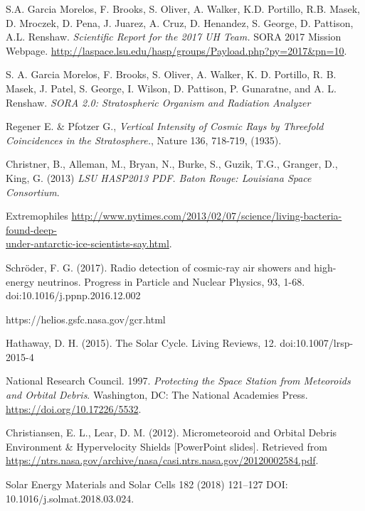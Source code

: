 \newpage

\begin{thebibliography}{9}
S.A. Garcia Morelos, F. Brooks, S. Oliver, A. Walker, K.D. Portillo, R.B. Masek, D. Mroczek, D. Pena, J. Juarez, A. Cruz, D. Henandez, S. George, D. Pattison, A.L. Renshaw. \textit{Scientific Report for the 2017 UH Team.} SORA 2017 Mission Webpage. \url{http://laspace.lsu.edu/hasp/groups/Payload.php?py=2017&pn=10}.

  S. A. Garcia Morelos, F. Brooks, S. Oliver, A. Walker, K. D. Portillo, R. B. Masek, J. Patel, S. George, I. Wilson, D. Pattison, P. Gunaratne, and A. L. Renshaw. \textit{SORA 2.0: Stratospheric Organism and Radiation Analyzer}

 Regener E. \& Pfotzer G., \textit{Vertical Intensity of Cosmic Rays by Threefold Coincidences in the Stratosphere.}, Nature 136, 718-719, (1935). 
  
  Christner, B., Alleman, M., Bryan, N., Burke, S., Guzik, T.G., Granger, D., King, G. (2013) \textit{LSU HASP2013 PDF. Baton Rouge: Louisiana Space Consortium}.

  Extremophiles \href{http://www.nytimes.com/2013/02/07/science/living-bacteria-found-deep-under-antarctic-ice-scientists-say.html}{http://www.nytimes.com/2013/02/07/science/living-bacteria-found-deep-\\under-antarctic-ice-scientists-say.html}.

  Schröder, F. G. (2017). Radio detection of cosmic-ray air showers and high-energy neutrinos. Progress in Particle and Nuclear Physics, 93, 1-68. doi:10.1016/j.ppnp.2016.12.002

  https://helios.gsfc.nasa.gov/gcr.html

  Hathaway, D. H. (2015). The Solar Cycle. Living Reviews, 12. doi:10.1007/lrsp-2015-4

  National Research Council. 1997. \textit{Protecting the Space Station from Meteoroids and Orbital Debris}. Washington, DC: The National Academies Press. \url{https://doi.org/10.17226/5532}.

  Christiansen, E. L., Lear, D. M. (2012). Micrometeoroid and Orbital Debris Environment \& Hypervelocity Shields [PowerPoint slides]. Retrieved from \url{https://ntrs.nasa.gov/archive/nasa/casi.ntrs.nasa.gov/20120002584.pdf}.
  
  Solar Energy Materials and Solar Cells 182 (2018) 121–127 DOI: 10.1016/j.solmat.2018.03.024.


\end{thebibliography}
